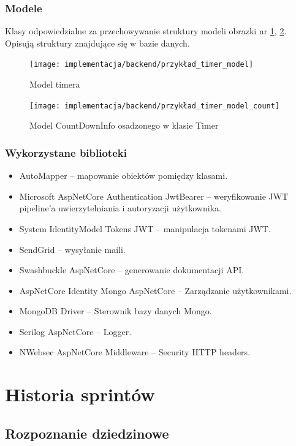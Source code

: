 \documentclass[a4paper,11pt]{report}
\begin{document}
\subsection{Modele}
Klasy odpowiedzialne za przechowywanie struktury modeli obrazki nr \ref{fig:przykład_timer_model},  \ref{fig:przykład_timer_model_count}. Opisują struktury znajdujące się w bazie danych.
\begin{figure}[H]
	\centering
	\texttt{[image: implementacja/backend/przykład\_timer\_model]}\\
	\caption{Model timera}
	\label{fig:przykład_timer_model}
\end{figure}
\begin{figure}[H]
	\centering
	\texttt{[image: implementacja/backend/przykład\_timer\_model\_count]}\\
	\caption{Model CountDownInfo osadzonego w klasie Timer}
	\label{fig:przykład_timer_model_count}
\end{figure}

\subsection{Wykorzystane biblioteki}
\begin{itemize}
	\item AutoMapper – mapowanie obiektów pomiędzy klasami.
	\item Microsoft AspNetCore Authentication JwtBearer – weryfikowanie JWT pipeline'a uwierzytelniania i autoryzacji użytkownika.
	\item System IdentityModel Tokens JWT – manipulacja tokenami JWT.
	\item SendGrid – wysyłanie maili.
	\item Swashbuckle AspNetCore – generowanie dokumentacji API.
	\item AspNetCore Identity Mongo AspNetCore – Zarządzanie użytkownikami.
	\item MongoDB Driver – Sterownik bazy danych Mongo.
	\item Serilog AspNetCore – Logger.
	\item NWebsec AspNetCore Middleware – Security HTTP headers.
\end{itemize}

\chapter {Historia sprintów}
\section {Rozpoznanie dziedzinowe}
\end{document}

